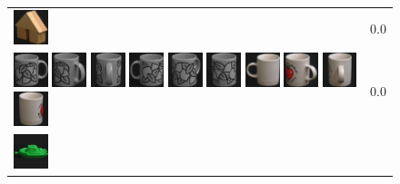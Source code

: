 \begin{figure}[tbp]
\begin{center}
\begin{tabular}{m{11cm} | m{3cm} |}
\includegraphics[width=1cm]{coil/beeld-46.eps}
& {\scriptsize 0.0}
\\
\includegraphics[width=1cm]{coil/beeld-48.eps}
\includegraphics[width=1cm]{coil/beeld-49.eps}
\includegraphics[width=1cm]{coil/beeld-50.eps}
\includegraphics[width=1cm]{coil/beeld-51.eps}
\includegraphics[width=1cm]{coil/beeld-53.eps}
\includegraphics[width=1cm]{coil/beeld-52.eps}
\includegraphics[width=1cm]{coil/beeld-37.eps}
\includegraphics[width=1cm]{coil/beeld-40.eps}
\includegraphics[width=1cm]{coil/beeld-41.eps}
\includegraphics[width=1cm]{coil/beeld-38.eps}
& {\scriptsize 0.0}
\\
\includegraphics[width=1cm]{coil/beeld-54.eps}

\end{tabular}
\end{center}
\end{figure}
